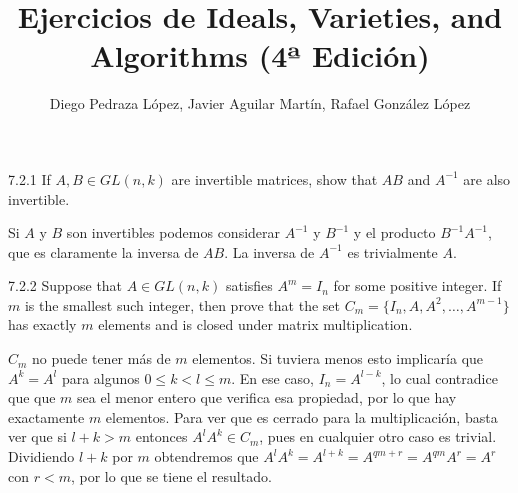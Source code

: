 \documentclass[twoside]{article}
\begin{document}
\title{Ejercicios de Ideals, Varieties, and Algorithms (4ª Edición)}
\author{Diego Pedraza López, Javier Aguilar Martín, Rafael González López}
\maketitle

\begin{ejercicio}{7.2.1}
If $A, B ∈ GL(n, k)$ are invertible matrices, show that $AB$ and $A^{−1}$ are also invertible.
\end{ejercicio}
\begin{solucion}
Si $A$ y $B$ son invertibles podemos considerar $A^{-1}$ y $B^{-1}$ y el producto $B^{-1}A^{-1}$, que es claramente la inversa de $AB$. La inversa de $A^{-1}$ es trivialmente $A$.
\end{solucion}

\newpage

\begin{ejercicio}{7.2.2}
Suppose that $A ∈ GL(n, k)$ satisfies $A^m = I_n$ for some positive integer. If $m$ is the
smallest such integer, then prove that the set $C_m = \{I_n, A, A^2,\dots , A^{m−1}\}$ has exactly $m$
elements and is closed under matrix multiplication.
\end{ejercicio}
\begin{solucion}
$C_m$ no puede tener más de $m$ elementos. Si tuviera menos esto implicaría que $A^k=A^l$ para algunos $0\leq k<l\leq m$. En ese caso, $I_n=A^{l-k}$, lo cual contradice que que $m$ sea el menor entero que verifica esa propiedad, por lo que hay exactamente $m$ elementos. Para ver que es cerrado para la multiplicación, basta ver que si $l+k> m$ entonces $A^lA^k\in C_m$, pues en cualquier otro caso es trivial. Dividiendo $l+k$ por $m$ obtendremos que $A^lA^k=A^{l+k}=A^{qm+r}=A^{qm}A^r=A^r$ con $r<m$, por lo que se tiene el resultado. 
\end{solucion}

\newpage
\end{document}
